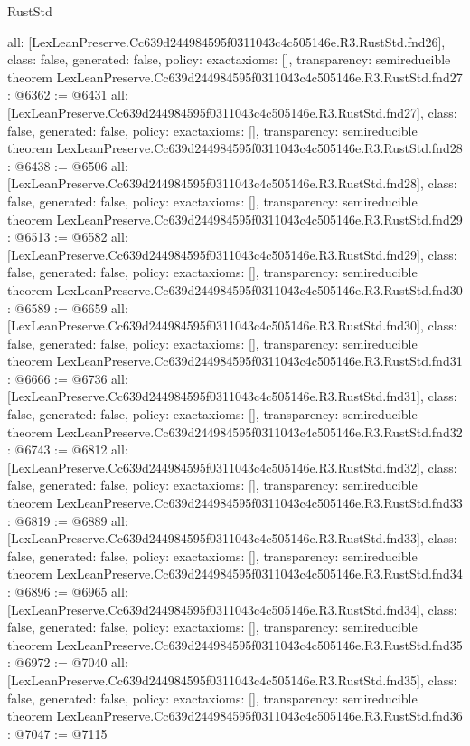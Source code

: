 \begin{lexlean}{RustStd}
\begin{coremodule}
{  all: [LexLeanPreserve.Cc639d244984595f0311043c4c505146e.R3.RustStd.fnd26],
  class: false,
  generated: false,
  policy: exact{axioms: []},
  transparency: semireducible
}
theorem LexLeanPreserve.Cc639d244984595f0311043c4c505146e.R3.RustStd.fnd27 : @6362 := @6431 {
  all: [LexLeanPreserve.Cc639d244984595f0311043c4c505146e.R3.RustStd.fnd27],
  class: false,
  generated: false,
  policy: exact{axioms: []},
  transparency: semireducible
}
theorem LexLeanPreserve.Cc639d244984595f0311043c4c505146e.R3.RustStd.fnd28 : @6438 := @6506 {
  all: [LexLeanPreserve.Cc639d244984595f0311043c4c505146e.R3.RustStd.fnd28],
  class: false,
  generated: false,
  policy: exact{axioms: []},
  transparency: semireducible
}
theorem LexLeanPreserve.Cc639d244984595f0311043c4c505146e.R3.RustStd.fnd29 : @6513 := @6582 {
  all: [LexLeanPreserve.Cc639d244984595f0311043c4c505146e.R3.RustStd.fnd29],
  class: false,
  generated: false,
  policy: exact{axioms: []},
  transparency: semireducible
}
theorem LexLeanPreserve.Cc639d244984595f0311043c4c505146e.R3.RustStd.fnd30 : @6589 := @6659 {
  all: [LexLeanPreserve.Cc639d244984595f0311043c4c505146e.R3.RustStd.fnd30],
  class: false,
  generated: false,
  policy: exact{axioms: []},
  transparency: semireducible
}
theorem LexLeanPreserve.Cc639d244984595f0311043c4c505146e.R3.RustStd.fnd31 : @6666 := @6736 {
  all: [LexLeanPreserve.Cc639d244984595f0311043c4c505146e.R3.RustStd.fnd31],
  class: false,
  generated: false,
  policy: exact{axioms: []},
  transparency: semireducible
}
theorem LexLeanPreserve.Cc639d244984595f0311043c4c505146e.R3.RustStd.fnd32 : @6743 := @6812 {
  all: [LexLeanPreserve.Cc639d244984595f0311043c4c505146e.R3.RustStd.fnd32],
  class: false,
  generated: false,
  policy: exact{axioms: []},
  transparency: semireducible
}
theorem LexLeanPreserve.Cc639d244984595f0311043c4c505146e.R3.RustStd.fnd33 : @6819 := @6889 {
  all: [LexLeanPreserve.Cc639d244984595f0311043c4c505146e.R3.RustStd.fnd33],
  class: false,
  generated: false,
  policy: exact{axioms: []},
  transparency: semireducible
}
theorem LexLeanPreserve.Cc639d244984595f0311043c4c505146e.R3.RustStd.fnd34 : @6896 := @6965 {
  all: [LexLeanPreserve.Cc639d244984595f0311043c4c505146e.R3.RustStd.fnd34],
  class: false,
  generated: false,
  policy: exact{axioms: []},
  transparency: semireducible
}
theorem LexLeanPreserve.Cc639d244984595f0311043c4c505146e.R3.RustStd.fnd35 : @6972 := @7040 {
  all: [LexLeanPreserve.Cc639d244984595f0311043c4c505146e.R3.RustStd.fnd35],
  class: false,
  generated: false,
  policy: exact{axioms: []},
  transparency: semireducible
}
theorem LexLeanPreserve.Cc639d244984595f0311043c4c505146e.R3.RustStd.fnd36 : @7047 := @7115 {
}
\end{coremodule}
\end{lexlean}
